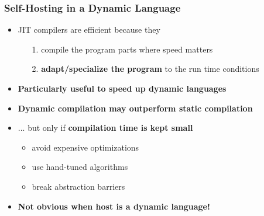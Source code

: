 \begin{frame}
\frametitle{\bf Self-Hosting in a Dynamic Language}

  \begin{itemize}

  \item JIT compilers are efficient because they
    \begin{itemize}
      \item[1.] compile the program parts where speed matters
      \item[2.] {\bf adapt/specialize the program} to the run time conditions
    \end{itemize}
    \smallskip

  \item {\bf Particularly useful to speed up dynamic languages}
    \smallskip

  \item {\bf Dynamic compilation may outperform static compilation}
    \smallskip

  \item ... but only if {\bf compilation time is kept small}
    \begin{itemize}
    \item avoid expensive optimizations
    \item use hand-tuned algorithms
    \item break abstraction barriers
    \end{itemize}
    \smallskip

  \item {\bf Not obvious when host is a dynamic language!}

  \end{itemize}
\end{frame}

